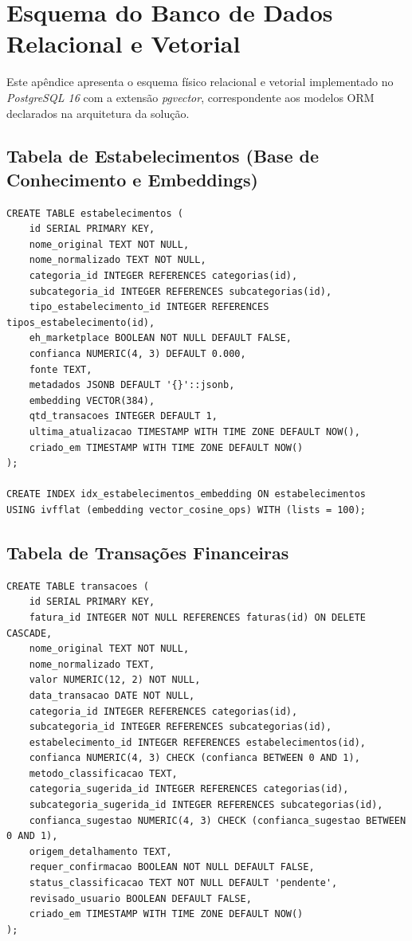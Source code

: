 \documentclass[
	12pt,				
	openright,			
	oneside,			
	a4paper,			
	english,			
	brazil				
	]{abntex2}
\begin{document}
\chapter{Esquema do Banco de Dados Relacional e Vetorial}
\label{apendice:esquema_banco}

Este apêndice apresenta o esquema físico relacional e vetorial implementado no \textit{PostgreSQL 16} com a extensão \textit{pgvector}, correspondente aos modelos ORM declarados na arquitetura da solução.

\section{Tabela de Estabelecimentos (Base de Conhecimento e Embeddings)}
\begin{verbatim}
CREATE TABLE estabelecimentos (
    id SERIAL PRIMARY KEY,
    nome_original TEXT NOT NULL,
    nome_normalizado TEXT NOT NULL,
    categoria_id INTEGER REFERENCES categorias(id),
    subcategoria_id INTEGER REFERENCES subcategorias(id),
    tipo_estabelecimento_id INTEGER REFERENCES tipos_estabelecimento(id),
    eh_marketplace BOOLEAN NOT NULL DEFAULT FALSE,
    confianca NUMERIC(4, 3) DEFAULT 0.000,
    fonte TEXT,
    metadados JSONB DEFAULT '{}'::jsonb,
    embedding VECTOR(384),
    qtd_transacoes INTEGER DEFAULT 1,
    ultima_atualizacao TIMESTAMP WITH TIME ZONE DEFAULT NOW(),
    criado_em TIMESTAMP WITH TIME ZONE DEFAULT NOW()
);

CREATE INDEX idx_estabelecimentos_embedding ON estabelecimentos 
USING ivfflat (embedding vector_cosine_ops) WITH (lists = 100);
\end{verbatim}

\section{Tabela de Transações Financeiras}
\begin{verbatim}
CREATE TABLE transacoes (
    id SERIAL PRIMARY KEY,
    fatura_id INTEGER NOT NULL REFERENCES faturas(id) ON DELETE CASCADE,
    nome_original TEXT NOT NULL,
    nome_normalizado TEXT,
    valor NUMERIC(12, 2) NOT NULL,
    data_transacao DATE NOT NULL,
    categoria_id INTEGER REFERENCES categorias(id),
    subcategoria_id INTEGER REFERENCES subcategorias(id),
    estabelecimento_id INTEGER REFERENCES estabelecimentos(id),
    confianca NUMERIC(4, 3) CHECK (confianca BETWEEN 0 AND 1),
    metodo_classificacao TEXT,
    categoria_sugerida_id INTEGER REFERENCES categorias(id),
    subcategoria_sugerida_id INTEGER REFERENCES subcategorias(id),
    confianca_sugestao NUMERIC(4, 3) CHECK (confianca_sugestao BETWEEN 0 AND 1),
    origem_detalhamento TEXT,
    requer_confirmacao BOOLEAN NOT NULL DEFAULT FALSE,
    status_classificacao TEXT NOT NULL DEFAULT 'pendente',
    revisado_usuario BOOLEAN DEFAULT FALSE,
    criado_em TIMESTAMP WITH TIME ZONE DEFAULT NOW()
);
\end{verbatim}


\end{document}
